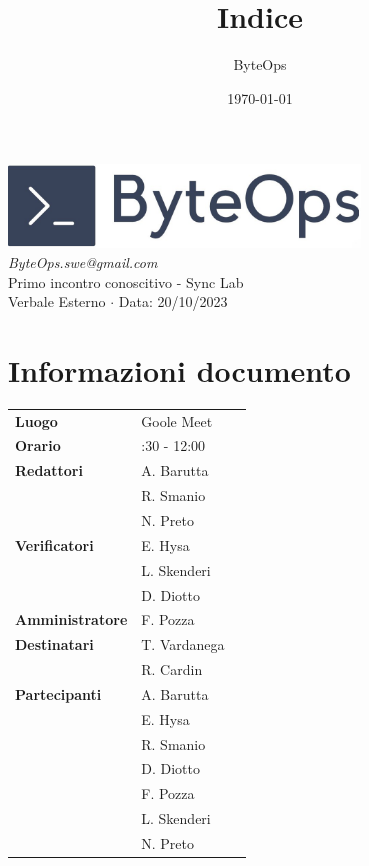 \documentclass{article}
\title{\textbf{\fontsize{30}{6}\selectfont Indice}}
\author{\fontsize{14}{6}\selectfont ByteOps}
\date{\today}
\begin{document}
\pagestyle{fancy}
\begin{center}
\includegraphics[width = 0.7\textwidth]{../../../Images/logo.png} \\
\vspace{0.2cm}
\textcolor[RGB]{60, 60, 60}{\textit{ByteOps.swe@gmail.com}} \\
\vspace{1cm}
\fontsize{16}{6}\selectfont Primo incontro conoscitivo - Sync Lab 
\\ Verbale Esterno $\cdot$ Data: 20/10/2023 \\
\vspace{0.5cm}
\end{center}

\section*{Informazioni documento}
\def\arraystretch{1.2}
\begin{tabular}{>{\raggedleft\arraybackslash}p{}|>{\raggedright\arraybackslash}p{}c}
\hline
\addlinespace
    \textbf{Luogo} & Goole Meet \vspace{10pt} \\
    \textbf{Orario} & 11:30 - 12:00 \vspace{10pt} \\
    \textbf{Redattori} & A. Barutta \\ & R. Smanio \\ & N. Preto \vspace{10pt} \\
    \textbf{Verificatori} & E. Hysa \\ & L. Skenderi \\ & D. Diotto \vspace{10pt} \\
    \textbf{Amministratore} & F. Pozza \vspace{10pt} \\
    \textbf{Destinatari} & T. Vardanega \\ & R. Cardin \vspace{10pt} \\
    \textbf{Partecipanti} & A. Barutta \\ & E. Hysa \\ & R. Smanio \\ & D. Diotto \\ & F. Pozza \\ & L. Skenderi \\ & N. Preto \vspace{10pt} \\
\end{tabular}
\pagebreak 
\end{document}
